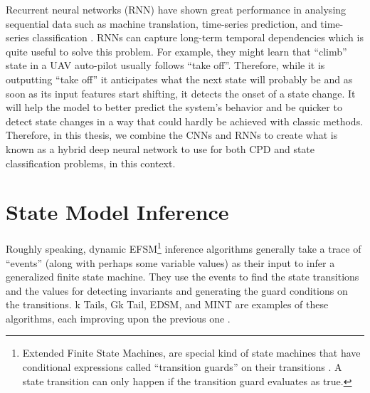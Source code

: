 Recurrent neural networks (RNN) have shown great performance in analysing sequential data such as machine translation, time-series prediction, and time-series classification \cite{cho2014learning, zhang2000predicting, wang2017time, murad2017deep, yang2015deep, Ordonez2016}. RNNs can capture long-term temporal dependencies which is quite useful to solve this problem. \cite{Che2018} For example, they might learn that ``climb'' state in a UAV auto-pilot usually follows ``take off''. Therefore, while it is outputting ``take off'' it anticipates what the next state will probably be and as soon as its input features start shifting, it detects the onset of a state change. It will help the model to better predict the system's behavior and be quicker to detect state changes in a way that could hardly be achieved with classic methods.
Therefore, in this thesis, we combine the CNNs and RNNs to create what is known as a hybrid deep neural network \cite{wang2017time} to use for both CPD and state classification problems, in this context.  











\section{State Model Inference}
Roughly speaking, dynamic EFSM\footnote{Extended Finite State Machines, are special kind of state machines that have conditional expressions called ``transition guards'' on their transitions \cite{lorenzoli2008automatic}. A state transition can only happen if the transition guard evaluates as true.} inference algorithms generally take a trace of ``events'' (along with perhaps some variable values) as their input \cite{walkinshaw2016inferring} to infer a generalized finite state machine. They use the events to find the state transitions and the values for detecting invariants and generating the guard conditions on the transitions. 
k Tails, Gk Tail, EDSM, and MINT are examples of these algorithms, each improving upon the previous one \cite{biermann1972synthesis, lorenzoli2008automatic, lang1998results, walkinshaw2016inferring}.  %

